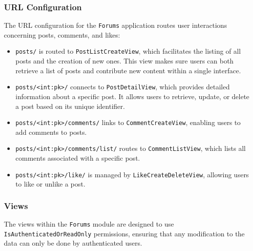 \subsubsection{URL Configuration}

The URL configuration for the \texttt{Forums} application routes user interactions concerning posts, comments, and likes:

\begin{itemize}
    \item \texttt{posts/} is routed to \texttt{PostListCreateView}, which facilitates the listing of all posts and the creation of new ones. This view makes sure users can both retrieve a list of posts and contribute new content within a single interface.
    \item \texttt{posts/<int:pk>/} connects to \texttt{PostDetailView}, which provides detailed information about a specific post. It allows users to retrieve, update, or delete a post based on its unique identifier.
    \item \texttt{posts/<int:pk>/comments/} links to \texttt{CommentCreateView}, enabling users to add comments to posts.
    \item \texttt{posts/<int:pk>/comments/list/} routes to \texttt{CommentListView}, which lists all comments associated with a specific post.
    \item \texttt{posts/<int:pk>/like/} is managed by \texttt{LikeCreateDeleteView}, allowing users to like or unlike a post.
\end{itemize}

\subsubsection{Views}

The views within the \texttt{Forums} module are designed to use \texttt{IsAuthenticatedOrReadOnly} permissions, ensuring that any modification to the data can only be done by authenticated users.

